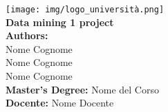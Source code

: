 \documentclass[a4paper, 10pt, twocolumn, DIV=calc]{scrartcl}
\begin{document}
\begin{titlepage}
    \centering
    \vspace*{1cm}

    \texttt{[image: img/logo\_università.png]} \\[1.5cm]

    {\Huge \textbf{Data mining 1 project}} \\[1cm]

    \Large
    \textbf{Authors:}\\ Nome Cognome \\
                        Nome Cognome \\
                        Nome Cognome \\

    \textbf{Master's Degree:} Nome del Corso \\
    \textbf{Docente:} Nome Docente \\[1cm]


    \vfill

\end{titlepage}




\end{document}
